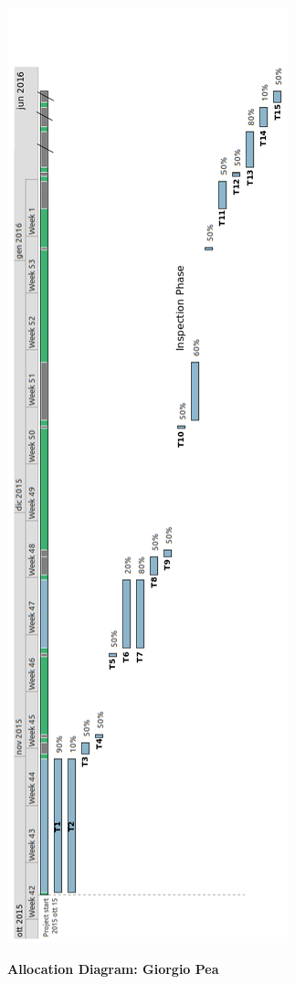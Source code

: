 \documentclass[11pt,titlepage]{article} %
\begin{document}
  \begin{center}
       \includegraphics[scale=0.35]{res1.png}
  \end{center}
  \newpage
  \textbf{Allocation Diagram: Giorgio Pea}\newline
\end{document}
